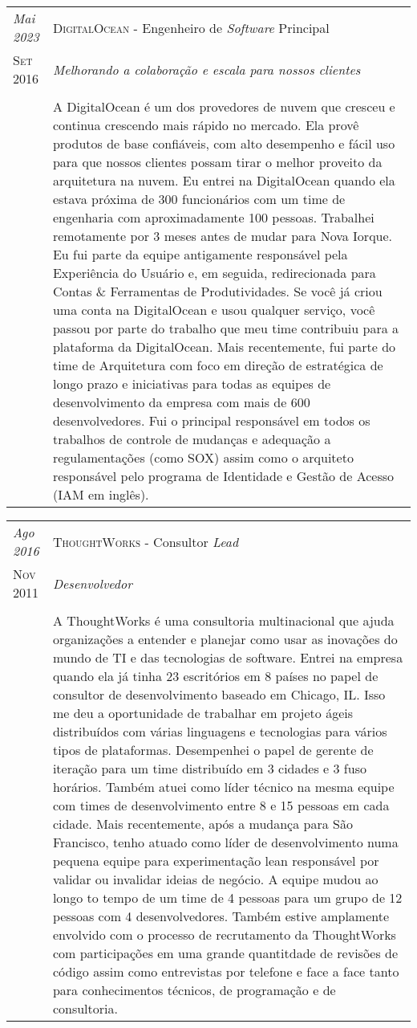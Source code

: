 \documentclass[letter,10pt]{article}
\begin{document}
\begin{tabular}{p{2.5cm}|p{13.5cm}}
  \emph{Mai 2023} & \textsc{DigitalOcean} - Engenheiro de \textit{Software} Principal\\
  \textsc{Set 2016}& \emph{Melhorando a colaboração e escala para nossos clientes}\\
  &\\
  &A DigitalOcean é um dos provedores de nuvem que cresceu e continua crescendo mais rápido no mercado. Ela provê produtos de base confiáveis, com alto desempenho e fácil uso para que nossos clientes possam tirar o melhor proveito da arquitetura na nuvem. Eu entrei na DigitalOcean quando ela estava próxima de 300 funcionários com um time de engenharia com aproximadamente 100 pessoas. Trabalhei remotamente por 3 meses antes de mudar para Nova Iorque. Eu fui parte da equipe antigamente responsável pela Experiência do Usuário e, em seguida, redirecionada para Contas \& Ferramentas de Produtividades. Se você já criou uma conta na DigitalOcean e usou qualquer serviço, você passou por parte do trabalho que meu time contribuiu para a plataforma da DigitalOcean. Mais recentemente, fui parte do time de Arquitetura com foco em direção de estratégica de longo prazo e iniciativas para todas as equipes de desenvolvimento da empresa com mais de 600 desenvolvedores. Fui o principal responsável em todos os trabalhos de controle de mudanças e adequação a regulamentações (como SOX) assim como o arquiteto responsável pelo programa de Identidade e Gestão de Acesso (IAM em inglês).
\end{tabular}


\begin{tabular}{p{2.5cm}|p{13.5cm}}
  \emph{Ago 2016} & \textsc{ThoughtWorks} - Consultor \textit{Lead}\\
  \textsc{Nov 2011}& \emph{Desenvolvedor}\\
  &\\
  &A ThoughtWorks é uma consultoria multinacional que ajuda organizações a entender e planejar como usar as inovações do mundo de TI e das tecnologias de software. Entrei na empresa quando ela já tinha 23 escritórios em 8 países no papel de consultor de desenvolvimento baseado em Chicago, IL. Isso me deu a oportunidade de trabalhar em projeto ágeis distribuídos com várias linguagens e tecnologias para vários tipos de plataformas. Desempenhei o papel de gerente de iteração para um time distribuído em 3 cidades e 3 fuso horários. Também atuei como líder técnico na mesma equipe com times de desenvolvimento entre 8 e 15 pessoas em cada cidade. Mais recentemente, após a mudança para São Francisco, tenho atuado como líder de desenvolvimento numa pequena equipe para experimentação lean responsável por validar ou invalidar ideias de negócio. A equipe mudou ao longo to tempo de um time de 4 pessoas para um grupo de 12 pessoas com 4 desenvolvedores. Também estive amplamente envolvido com o processo de recrutamento da ThoughtWorks com participações em uma grande quantitdade de revisões de código assim como entrevistas por telefone e face a face tanto para conhecimentos técnicos, de programação e de consultoria.
\end{tabular}
\end{document}
